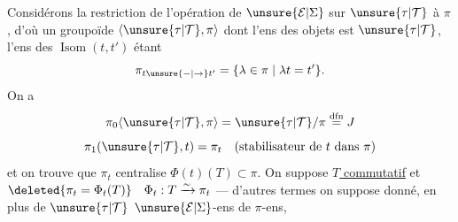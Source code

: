 
Considérons la restriction de l'opération de $\unsure{\mathcal E|\Sigma}$ sur $\unsure{\tau|\mathcal T}$ à $\pi$, d'où un groupoïde $\langle\unsure{\tau|\mathcal T},\pi\rangle$ dont l'ens des objets est $\unsure{\tau|\mathcal T}$, l'ens des $\operatorname{Isom}(t,t')$ étant
\[
\pi_{t\unsure{\mathbin{-}|\to}t'}=\{\lambda\in\pi\mid\lambda t=t'\}.
\]
 On a
\[
\pi_0\langle\unsure{\tau|\mathcal T},\pi\rangle=\unsure{\tau|\mathcal T}/\pi\overset{\mathrm{dfn}}{=}J
\]
\[
\pi_1(\unsure{\tau|\mathcal T},t)=\pi_t\quad(\text{stabilisateur de }t\text{ dans }\pi)
\]
et on trouve que $\pi_t$ centralise $\Phi(t)(T)\subset\pi$. On suppose \uline{$T$ commutatif} et $\deleted{\pi_t=\Phi_t(T)}\quad\Phi_t:T\xrightarrow{\sim}\pi_t$ ---  d'autres termes on suppose donné, en plus de $\unsure{\tau|\mathcal T}$ $\unsure{\mathcal E|\Sigma}$-ens de $\pi$-ens,
